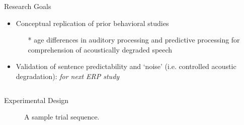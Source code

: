 \documentclass[final,12pt]{beamer}
\begin{document}
\begin{frame}[t]
\begin{columns}[t]
\begin{block}{Research Goals}
    \vspace{-2.3cm}
    \vspace{1.2em}
    \begin{itemize}
        \item {Conceptual replication of prior behavioral studies}
            \begin{itemize}
                \item[\tiny{*}] age differences in auditory processing and predictive processing for comprehension of acoustically degraded speech
            \end{itemize}
         \vspace{0.3em}
        \item {Validation of sentence predictability and `noise' (i.e. controlled acoustic degradation): \textit{for next ERP study}}
    \end{itemize}
\end{block}
\end{columns}
    
\begin{block}{Experimental Design}
            \vspace{-1.0em}
      \begin{figure}
        \centering
        
            \vspace{-1.8em}
        \caption{A sample trial sequence.}
      \end{figure}
\end{block}


\end{frame}
\end{document}

